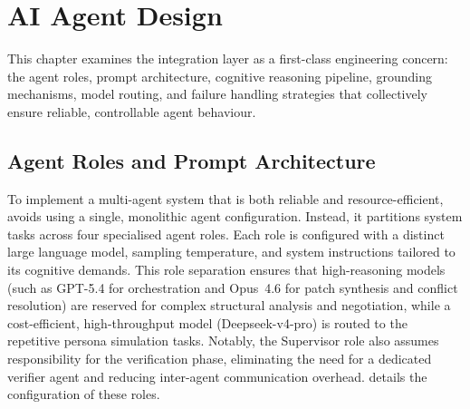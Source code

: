 \chapter{AI Agent Design}
\label{ch:ai-design}

This chapter examines the  integration layer as a first-class engineering concern: the agent roles, prompt architecture, cognitive reasoning pipeline, grounding mechanisms, model routing, and failure handling strategies that collectively ensure reliable, controllable agent behaviour.


\section{Agent Roles and Prompt Architecture}
\label{sec:agent-roles}

To implement a multi-agent system that is both reliable and resource-efficient, \versimux{} avoids using a single, monolithic agent configuration. Instead, it partitions system tasks across four specialised agent roles. Each role is configured with a distinct large language model, sampling temperature, and system instructions tailored to its cognitive demands. This role separation ensures that high-reasoning models (such as GPT-5.4 for orchestration and Opus~4.6 for patch synthesis and conflict resolution) are reserved for complex structural analysis and negotiation, while a cost-efficient, high-throughput model (Deepseek-v4-pro) is routed to the repetitive persona simulation tasks. Notably, the Supervisor role also assumes responsibility for the verification phase, eliminating the need for a dedicated verifier agent and reducing inter-agent communication overhead.  details the configuration of these roles.

